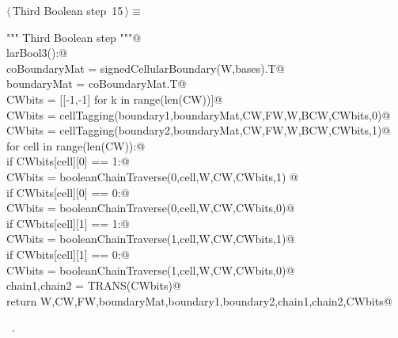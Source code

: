 \documentclass[11pt,oneside]{article}	%
\begin{document}
\begin{flushleft} \small \label{scrap16}
\protect{}$\langle\,$Third Boolean step\nobreak\ {\footnotesize 15}$\,\rangle\equiv$
\vspace{-1ex}
\begin{list}{}{} \item
\mbox{}\verb@""" Third Boolean step """@\\
\mbox{}\verb@def larBool3():@\\
\mbox{}\verb@   coBoundaryMat = signedCellularBoundary(W,bases).T@\\
\mbox{}\verb@   boundaryMat = coBoundaryMat.T@\\
\mbox{}\verb@   CWbits = [[-1,-1] for k in range(len(CW))]@\\
\mbox{}\verb@   CWbits = cellTagging(boundary1,boundaryMat,CW,FW,W,BCW,CWbits,0)@\\
\mbox{}\verb@   CWbits = cellTagging(boundary2,boundaryMat,CW,FW,W,BCW,CWbits,1)@\\
\mbox{}\verb@   for cell in range(len(CW)):@\\
\mbox{}\verb@      if CWbits[cell][0] == 1:@\\
\mbox{}\verb@         CWbits = booleanChainTraverse(0,cell,W,CW,CWbits,1)      @\\
\mbox{}\verb@      if CWbits[cell][0] == 0:@\\
\mbox{}\verb@         CWbits = booleanChainTraverse(0,cell,W,CW,CWbits,0)@\\
\mbox{}\verb@      if CWbits[cell][1] == 1:@\\
\mbox{}\verb@         CWbits = booleanChainTraverse(1,cell,W,CW,CWbits,1)@\\
\mbox{}\verb@      if CWbits[cell][1] == 0:@\\
\mbox{}\verb@         CWbits = booleanChainTraverse(1,cell,W,CW,CWbits,0)@\\
\mbox{}\verb@   chain1,chain2 = TRANS(CWbits)@\\
\mbox{}\verb@   return W,CW,FW,boundaryMat,boundary1,boundary2,chain1,chain2,CWbits@\\
\mbox{}\verb@@{\NWsep}
\end{list}
\vspace{-1ex}
\footnotesize\addtolength{\baselineskip}{-1ex}
\begin{list}{}{\setlength{\itemsep}{-\parsep}\setlength{\itemindent}{-\leftmargin}}
\item \NWtxtMacroRefIn\ .
\end{list}
\end{flushleft}
\end{document}
